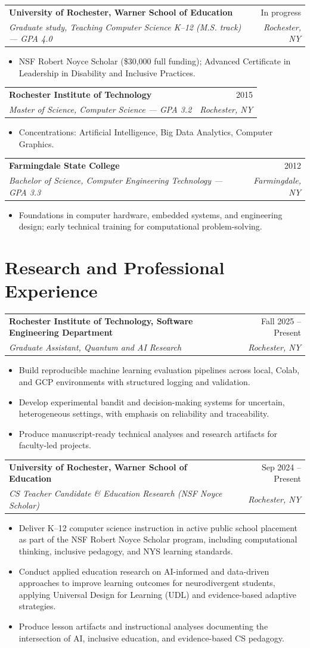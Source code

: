 \documentclass[11pt]{article}
\makeatletter
\newcommand{\entry}[4]{
  \noindent\begin{tabularx}{\textwidth}{@{}Xr@{}}
    \textbf{#1} & #2 \\
    \textit{#3} & \textit{#4}
  \end{tabularx}\vspace{2pt}
}
\makeatother
\begin{document}
\entry{University of Rochester, Warner School of Education}{In progress}{Graduate study, Teaching Computer Science K--12 (M.S. track) --- GPA 4.0}{Rochester, NY}
\begin{itemize}
  \item NSF Robert Noyce Scholar (\$30,000 full funding); Advanced Certificate in Leadership in Disability and Inclusive Practices.
\end{itemize}

\entry{Rochester Institute of Technology}{2015}{Master of Science, Computer Science --- GPA 3.2}{Rochester, NY}
\begin{itemize}
  \item Concentrations: Artificial Intelligence, Big Data Analytics, Computer Graphics.
\end{itemize}

\entry{Farmingdale State College}{2012}{Bachelor of Science, Computer Engineering Technology --- GPA 3.3}{Farmingdale, NY}
\begin{itemize}
  \item Foundations in computer hardware, embedded systems, and engineering design; early technical training for computational problem-solving.
\end{itemize}

\section{Research and Professional Experience}
\entry{Rochester Institute of Technology, Software Engineering Department}{Fall 2025 -- Present}{Graduate Assistant, Quantum and AI Research}{Rochester, NY}
\begin{itemize}
  \item Build reproducible machine learning evaluation pipelines across local, Colab, and GCP environments with structured logging and validation.
  \item Develop experimental bandit and decision-making systems for uncertain, heterogeneous settings, with emphasis on reliability and traceability.
  \item Produce manuscript-ready technical analyses and research artifacts for faculty-led projects.
\end{itemize}

\entry{University of Rochester, Warner School of Education}{Sep 2024 -- Present}{CS Teacher Candidate \& Education Research (NSF Noyce Scholar)}{Rochester, NY}
\begin{itemize}
  \item Deliver K--12 computer science instruction in active public school placement as part of the NSF Robert Noyce Scholar program, including computational thinking, inclusive pedagogy, and NYS learning standards.
  \item Conduct applied education research on AI-informed and data-driven approaches to improve learning outcomes for neurodivergent students, applying Universal Design for Learning (UDL) and evidence-based adaptive strategies.
  \item Produce lesson artifacts and instructional analyses documenting the intersection of AI, inclusive education, and evidence-based CS pedagogy.
\end{itemize}
\end{document}
